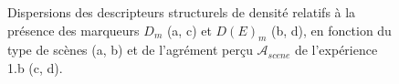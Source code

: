 \begin{figure}[t]
        \myfloatalign
        \par
       \caption{Dispersions  des descripteurs structurels de densité relatifs à la présence des marqueurs $D_m$ (a, c) et $D(E)_m$ (b, d), en fonction du type de scènes (a, b) et de l'agrément perçu $\mathcal{A}_{scene}$ de l'expérience 1.b (c, d).}\label{fig:densityMarker}
\end{figure}

